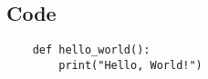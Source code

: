 \subsection{Code}
\begin{lstlisting}
    def hello_world():
        print("Hello, World!")
\end{lstlisting}